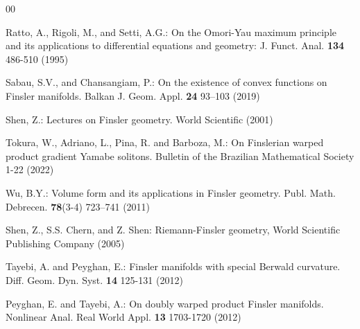 \documentclass[pdflatex,sn-mathphys-num]{sn-jnl}%
\theoremstyle{thmstyleone}%
\theoremstyle{thmstyletwo}%
\theoremstyle{thmstylethree}%
\begin{document}
\begin{thebibliography}{00}
  
		 Ratto, A., Rigoli, M., and Setti, A.G.: On the Omori-Yau maximum principle and its applications to differential equations and geometry: J. Funct. Anal. {\bf134}  486-510 (1995)
		
		
		 Sabau, S.V., and  Chansangiam, P.:  On the existence of convex functions on Finsler manifolds.  Balkan J. Geom. Appl. {\bf24} 93–103 (2019)
		
		
		
		 Shen, Z.:  Lectures on Finsler geometry. World Scientific (2001)
		
		
		
		
		 Tokura, W., Adriano, L., Pina, R. and Barboza, M.:  On Finslerian warped product gradient Yamabe solitons. Bulletin of the Brazilian Mathematical Society 1-22 (2022)
  
		  Wu, B.Y.:  Volume form and its applications in Finsler geometry. Publ. Math. Debrecen. {\bf78}(3-4) 723--741 (2011)
		
		
  
		 Shen, Z.,  S.S. Chern, and Z. Shen: Riemann-Finsler geometry, World Scientific Publishing Company (2005)

  
		  Tayebi, A. and Peyghan, E.:  Finsler manifolds with special Berwald curvature. Diff. Geom. Dyn. Syst. {\bf14}  125-131 (2012)

        Peyghan, E. and Tayebi, A.:  On doubly warped product Finsler manifolds. Nonlinear Anal. Real World Appl. {\bf13}  1703-1720 (2012)
		
		

\end{thebibliography}



\end{document}
